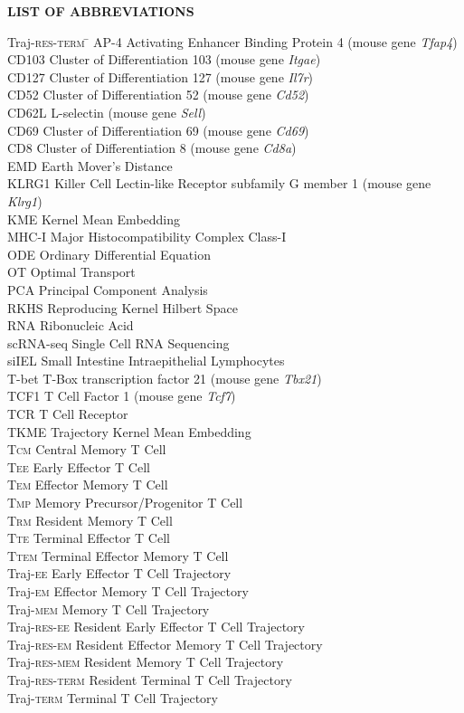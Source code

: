 {}

\begin{center}
{\normalfont \textbf{LIST OF ABBREVIATIONS}}
\end{center}

\newcommand{\Ab}[2]{\noindent  #1 \> #2 \\}
\newcommand{\Abi}[2]{\noindent #1 \hspace{1.5cm} \= #2 \\}

\begin{tabbing}
Traj-\textsc{res-term}\hspace{1.5cm} \= \kill
\Ab{AP-4}{Activating Enhancer Binding Protein 4 (mouse gene \textit{Tfap4})}
\Ab{CD103}{Cluster of Differentiation 103 (mouse gene \textit{Itgae})}
\Ab{CD127}{Cluster of Differentiation 127 (mouse gene \textit{Il7r})}
\Ab{CD52}{Cluster of Differentiation 52 (mouse gene \textit{Cd52})}
\Ab{CD62L}{L-selectin (mouse gene \textit{Sell})}
\Ab{CD69}{Cluster of Differentiation 69 (mouse gene \textit{Cd69})}
\Ab{CD8}{Cluster of Differentiation 8 (mouse gene \textit{Cd8a})}
\Ab{EMD}{Earth Mover's Distance}
\Ab{KLRG1}{Killer Cell Lectin-like Receptor subfamily G member 1 (mouse gene \textit{Klrg1})}
\Ab{KME}{Kernel Mean Embedding}
\Ab{MHC-I}{Major Histocompatibility Complex Class-I}
\Ab{ODE}{Ordinary Differential Equation}
\Ab{OT}{Optimal Transport}
\Ab{PCA}{Principal Component Analysis}
\Ab{RKHS}{Reproducing Kernel Hilbert Space}
\Ab{RNA}{Ribonucleic Acid}
\Ab{scRNA-seq}{Single Cell RNA Sequencing}
\Ab{siIEL}{Small Intestine Intraepithelial Lymphocytes}
\Ab{T-bet}{T-Box transcription factor 21 (mouse gene \textit{Tbx21})}
\Ab{TCF1}{T Cell Factor 1 (mouse gene \textit{Tcf7})}
\Ab{TCR}{T Cell Receptor}
\Ab{TKME}{Trajectory Kernel Mean Embedding}
\Ab{T\textsc{cm}}{Central Memory T Cell}
\Ab{T\textsc{ee}}{Early Effector T Cell}
\Ab{T\textsc{em}}{Effector Memory T Cell}
\Ab{T\textsc{mp}}{Memory Precursor/Progenitor T Cell}
\Ab{T\textsc{rm}}{Resident Memory T Cell}
\Ab{T\textsc{te}}{Terminal Effector T Cell}
\Ab{T\textsc{tem}}{Terminal Effector Memory T Cell}
\Ab{Traj-\textsc{ee}}{Early Effector T Cell Trajectory}
\Ab{Traj-\textsc{em}}{Effector Memory T Cell Trajectory}
\Ab{Traj-\textsc{mem}}{Memory T Cell Trajectory}
\Ab{Traj-\textsc{res-ee}}{Resident Early Effector T Cell Trajectory}
\Ab{Traj-\textsc{res-em}}{Resident Effector Memory T Cell Trajectory}
\Ab{Traj-\textsc{res-mem}}{Resident Memory T Cell Trajectory}
\Ab{Traj-\textsc{res-term}}{Resident Terminal T Cell Trajectory}
\Ab{Traj-\textsc{term}}{Terminal T Cell Trajectory}
\end{tabbing}

\clearpage
